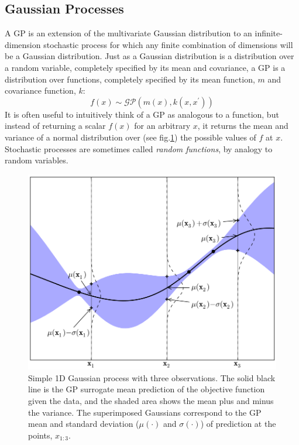 \subsection{Gaussian Processes}
A GP is an extension of the multivariate Gaussian distribution to an infinite-dimension stochastic process for which any finite combination of dimensions will be a Gaussian distribution.\cite{Freitas-BO} 
Just as a Gaussian distribution is a distribution over a random variable, completely specified by its mean and covariance, a GP is a distribution over functions, completely specified by its mean function, $m$ and covariance function, $k$: $$ f(x) \sim \mathcal{GP}(m(x),k(x,x^\prime)) $$
It is often useful to intuitively think of a GP as analogous to a function, but instead of returning a scalar $f(x)$ for an arbitrary $x$, it returns the mean and variance of a normal distribution over (see fig.\ref{fig:gp-example}) the possible values of $f$ at $x$.
Stochastic processes are sometimes called \textit{random functions}, by analogy to random variables.
\begin{figure}[h]
	\centering
	\includegraphics[scale=0.40]{figures/gp.png}
	\caption{Simple 1D Gaussian process with three observations. The solid black line is the GP surrogate mean prediction of the objective function given the data, and the shaded area shows the mean plus and minus the variance. The superimposed Gaussians correspond to the GP mean and standard deviation ($\mu(\cdot)$ and $\sigma(\cdot)$) of prediction at the points, $x_{1:3}$.}

	\label{fig:gp-example}
\end{figure}


